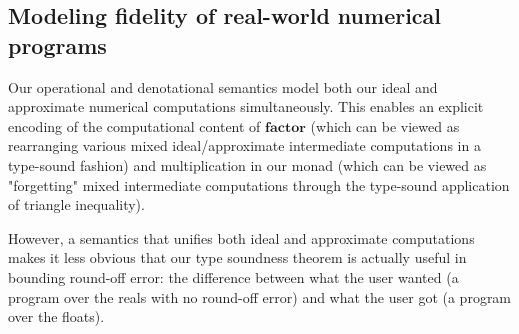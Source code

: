 \subsection{Modeling fidelity of real-world numerical programs}
Our operational and denotational semantics model both our ideal and approximate
numerical computations simultaneously. This enables an explicit encoding of the
computational content of $\textbf{factor}$ (which can be viewed as rearranging
various mixed ideal/approximate intermediate computations in a type-sound
fashion) and multiplication in our monad (which can be viewed as "forgetting"
mixed intermediate computations through the type-sound application of triangle
inequality).

However, a semantics that unifies both ideal and approximate computations makes
it less obvious that our type soundness theorem is actually useful in bounding
round-off error: the difference between what the user wanted (a program over the
reals with no round-off error) and what the user got (a program over the
floats).

